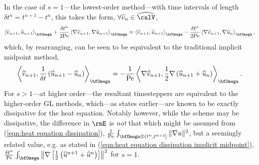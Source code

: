\begin{example}
        In the case of $s  =  1$—the lowest-order method—with time intervals of length $\delta t^{n} 
         =  t^{n + 1} - t^{n}$, this takes the form, $\forall \widehat{v}_{n}  \in  \widehat{\calV}$,
        \begin{equation}
            \left\langle\widehat{v}_{n + 1}, \widehat{u}_{n + 1}\right\rangle_{\bfOmega} + \frac{\delta t^{n}}{2\rmPe}\left\langle\nabla\widehat{v}_{n + 1}, \nabla\widehat{u}_{n + 1}\right\rangle_{\bfOmega}  =  \left\langle\widehat{v}_{n + 1}, \widehat{u}_{n + 1}\right\rangle_{\bfOmega} - \frac{\delta t^{n}}{2\rmPe}\left\langle\nabla\widehat{v}_{n + 1}, \nabla\widehat{u}_{n}\right\rangle_{\bfOmega},
        \end{equation}
        which, by rearranging, can be seen to be equivalent to the traditional implicit midpoint method,
        \begin{equation}
            \left\langle\widehat{v}_{n + 1}, \frac{1}{\delta t}\left(\widehat{u}_{n + 1} - \widehat{u}_{n}\right)\right\rangle_{\bfOmega}  =  - \frac{1}{\rmPe}\left\langle\nabla\widehat{v}_{n + 1}, \frac{1}{2}\nabla\left(\widehat{u}_{n + 1} + \widehat{u}_{n}\right)\right\rangle_{\bfOmega}.
        \end{equation}
        For $s  >  1$—at higher order—the resultant timesteppers are equivalent to the higher-order GL methods, which—as states earlier—are known to be exactly dissipative for the heat equation. Notably however, while the scheme may be dissipative, the difference in $\rmE$ is \emph{not} that which might be assumed from (\ref{eqn:heat equation dissipation}), $\frac{1}{\rmPe}\int_{\bfOmega\otimes\left(t^{n}, t^{n + 1}\right]}\|\nabla u\|^{2}$, but a seemingly related value, e.g. as stated in (\ref{eqn:heat equation dissipation implicit midpoint}), $\frac{\delta t^{n}}{\rmPe}\int_{\bfOmega}\left\|\nabla\left[\frac{1}{2}\left(\widehat{u}^{n + 1} + \widehat{u}^{n}\right)\right]\right\|^{2}$ for $s = 1$.
    \end{example}